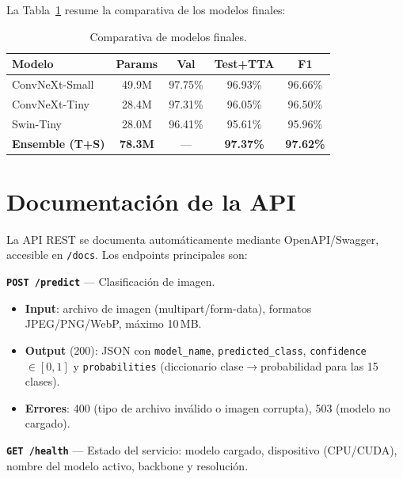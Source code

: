 \documentclass[10pt,a4paper,twocolumn]{article}
\begin{document}
La Tabla~\ref{tab:comparison} resume la comparativa de los modelos finales:

\begin{table}[H]
\centering
\caption{Comparativa de modelos finales.}
\label{tab:comparison}
\small
\setlength{\tabcolsep}{2.5pt}
\begin{tabular}{lcccc}
\toprule
\textbf{Modelo} & \textbf{Params} & \textbf{Val} & \textbf{Test+TTA} & \textbf{F1} \\
\midrule
ConvNeXt-Small  & 49.9M & 97.75\% & 96.93\% & 96.66\% \\
ConvNeXt-Tiny   & 28.4M & 97.31\% & 96.05\% & 96.50\% \\
Swin-Tiny       & 28.0M & 96.41\% & 95.61\% & 95.96\% \\
\rowcolor{lightgray}
\textbf{Ensemble (T+S)} & \textbf{78.3M} & --- & \textbf{97.37\%} & \textbf{97.62\%} \\
\bottomrule
\end{tabular}
\end{table}

\section{Documentación de la API}

La API REST se documenta automáticamente mediante OpenAPI/Swagger, accesible en \texttt{/docs}. Los endpoints principales son:

\smallskip
\noindent\textbf{\texttt{POST /predict}} --- Clasificación de imagen.
\begin{itemize}
    \item \textbf{Input}: archivo de imagen (multipart/form-data), formatos JPEG/PNG/WebP, máximo 10\,MB.
    \item \textbf{Output} (200): JSON con \texttt{model\_name}, \texttt{predicted\_class}, \texttt{confidence} $\in [0,1]$ y \texttt{probabilities} (diccionario clase$\to$probabilidad para las 15 clases).
    \item \textbf{Errores}: 400 (tipo de archivo inválido o imagen corrupta), 503 (modelo no cargado).
\end{itemize}

\noindent\textbf{\texttt{GET /health}} --- Estado del servicio: modelo cargado, dispositivo (CPU/CUDA), nombre del modelo activo, backbone y resolución.
\end{document}
